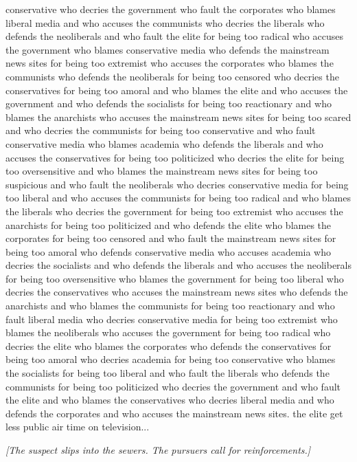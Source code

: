 \documentclass{report}
\begin{document}
conservative who decries the government who fault the corporates who blames liberal media and who accuses the communists who decries the liberals who defends the neoliberals and who fault the elite for being too radical who accuses the government who blames conservative media who defends the mainstream news sites for being too extremist who accuses the corporates who blames the communists who defends the neoliberals for being too censored who decries the conservatives for being too amoral and who blames the elite and who accuses the government and who defends the socialists for being too reactionary and who blames the anarchists who accuses the mainstream news sites for being too scared and who decries the communists for being too conservative and who fault conservative media who blames academia who defends the liberals and who accuses the conservatives for being too politicized who decries the elite for being too oversensitive and who blames the mainstream news sites for being too suspicious and who fault the neoliberals who decries conservative media for being too liberal and who accuses the communists for being too radical and who blames the liberals who decries the government for being too extremist who accuses the anarchists for being too politicized and who defends the elite who blames the corporates for being too censored and who fault the mainstream news sites for being too amoral who defends conservative media who accuses academia who decries the socialists and who defends the liberals and who accuses the neoliberals for being too oversensitive who blames the government for being too liberal who decries the conservatives who accuses the mainstream news sites who defends the anarchists and who blames the communists for being too reactionary and who fault liberal media who decries conservative media for being too extremist who blames the neoliberals who accuses the government for being too radical who decries the elite who blames the corporates who defends the conservatives for being too amoral who decries academia for being too conservative who blames the socialists for being too liberal and who fault the liberals who defends the communists for being too politicized who decries the government and who fault the elite and who blames the conservatives who decries liberal media and who defends the corporates and who accuses the mainstream news sites. the elite get less public air time on television...

\textit{[The suspect slips into the sewers. The pursuers call for reinforcements.]}
\end{document}
